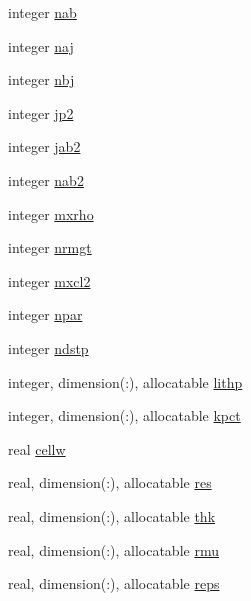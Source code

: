 \begin{DoxyCompactItemize}
\item 
integer \hyperlink{namespacelg__input__routines_ad8cb720dd00a45f91821df0e50967fc4}{nab}
\item 
integer \hyperlink{namespacelg__input__routines_a6a4d2fe97ff751ec658cd7c4c32c8dd8}{naj}
\item 
integer \hyperlink{namespacelg__input__routines_a422223cb66d2146d9c188127e4a028e2}{nbj}
\item 
integer \hyperlink{namespacelg__input__routines_aeeb364d56f6ccfca2d83c6f2f2116115}{jp2}
\item 
integer \hyperlink{namespacelg__input__routines_aa8dab0fb04a941c104a2358b9964b3cb}{jab2}
\item 
integer \hyperlink{namespacelg__input__routines_a8c395208e3c4b867a9efb124950523a2}{nab2}
\item 
integer \hyperlink{namespacelg__input__routines_a32d71e3a5fd9797e3422ec85a3ba569b}{mxrho}
\item 
integer \hyperlink{namespacelg__input__routines_af065b07a125b49a6638714fca2349dab}{nrmgt}
\item 
integer \hyperlink{namespacelg__input__routines_a2a758312b4913fc8c9b224c38fe7e237}{mxcl2}
\item 
integer \hyperlink{namespacelg__input__routines_a541838bde966c293ecaa09ac831cdb04}{npar}
\item 
integer \hyperlink{namespacelg__input__routines_a22a8c2d22e2d56ee4bc62e61d835e08e}{ndstp}
\item 
integer, dimension(\+:), allocatable \hyperlink{namespacelg__input__routines_aedb9ca6e70c3410a22b403679af5fc20}{lithp}
\item 
integer, dimension(\+:), allocatable \hyperlink{namespacelg__input__routines_aea4fa508483e9e73a626c0e62232d1f4}{kpct}
\item 
real \hyperlink{namespacelg__input__routines_a5aaa08577983b3738ea36301b56c0410}{cellw}
\item 
real, dimension(\+:), allocatable \hyperlink{namespacelg__input__routines_ae3a8a91ea2d57c11242ff73731b2c9e9}{res}
\item 
real, dimension(\+:), allocatable \hyperlink{namespacelg__input__routines_a199d87b93f3f5ab8b25fcd0640c45b7d}{thk}
\item 
real, dimension(\+:), allocatable \hyperlink{namespacelg__input__routines_a6ea167ba918b3575bd7587145486068b}{rmu}
\item 
real, dimension(\+:), allocatable \hyperlink{namespacelg__input__routines_af61c1a97123787059f666eb146880b2e}{reps}

\end{DoxyCompactItemize}
